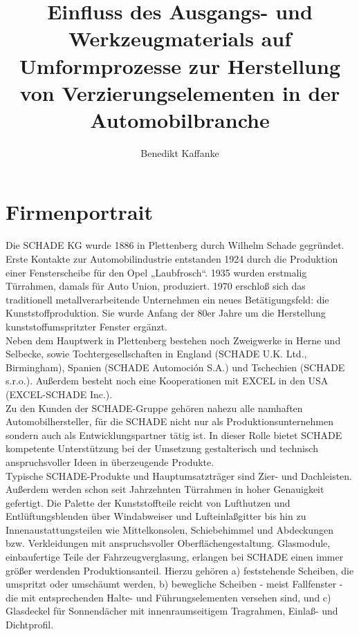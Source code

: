 \documentclass[12pt,a4paper,parskip,twoside,BCOR5mm,headsepline]{scrartcl}
\begin{document}
\author{Benedikt Kaffanke}
\title{Einfluss des Ausgangs- und  Werkzeugmaterials auf Umformprozesse zur Herstellung von Verzierungselementen in der Automobilbranche}
\maketitle\thispagestyle{empty}

\cleardoublepage

\newpage
{}

\tableofcontents
\cleardoublepage



\newpage
{}

\section{Firmenportrait}
Die SCHADE KG wurde 1886 in Plettenberg durch Wilhelm Schade gegründet. Erste Kontakte zur Automobilindustrie entstanden 1924 durch die Produktion einer Fensterscheibe für den Opel „Laubfrosch“. 1935 wurden erstmalig Türrahmen, damals für Auto Union, produziert. 1970 erschloß sich das traditionell metallverarbeitende Unternehmen ein neues Betätigungsfeld: die Kunststoffproduktion. Sie wurde Anfang der 80er Jahre um die Herstellung kunststoffumspritzter Fenster ergänzt.\\
Neben dem Hauptwerk in Plettenberg bestehen noch Zweigwerke in Herne und Selbecke, sowie Tochtergesellschaften in England (SCHADE U.K. Ltd., Birmingham), Spanien (SCHADE Automoción S.A.) und Tschechien (SCHADE s.r.o.). Außerdem besteht noch eine Kooperationen mit EXCEL in den USA (EXCEL-SCHADE Inc.).\\
Zu den Kunden der SCHADE-Gruppe gehören nahezu alle namhaften Automobilhersteller, für die SCHADE nicht nur als Produktionsunternehmen sondern auch als Entwicklungspartner tätig ist. In dieser Rolle bietet SCHADE kompetente Unterstützung bei der Umsetzung gestalterisch und technisch anspruchsvoller Ideen in überzeugende Produkte.\\
Typische SCHADE-Produkte und Hauptumsatzträger sind Zier- und Dachleisten. Außerdem werden schon seit Jahrzehnten Türrahmen in hoher Genauigkeit gefertigt. Die Palette der Kunststoffteile reicht von Lufthutzen und Entlüftungsblenden über Windabweiser und Lufteinlaßgitter bis hin zu Innenaustattungsteilen wie Mittelkonsolen, Schiebehimmel und Abdeckungen bzw. Verkleidungen mit anspruchsvoller Oberflächengestaltung. Glasmodule, einbaufertige Teile der Fahrzeugverglasung, erlangen bei SCHADE einen immer größer werdenden Produktionsanteil. Hierzu gehören a) feststehende Scheiben, die umspritzt oder umschäumt werden, b) bewegliche Scheiben - meist Fallfenster - die mit entsprechenden Halte- und Führungselementen versehen sind, und c) Glasdeckel für Sonnendächer mit innenraumseitigem Tragrahmen, Einlaß- und Dichtprofil.
\end{document}
